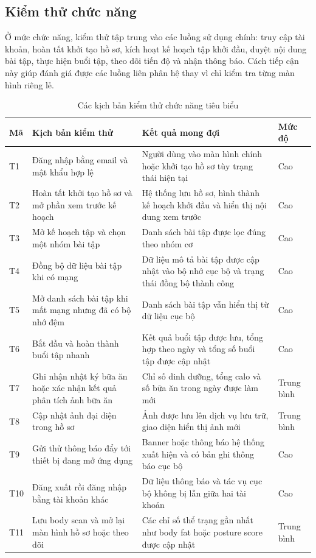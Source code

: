\subsection{Kiểm thử chức năng}

Ở mức chức năng, kiểm thử tập trung vào các luồng sử dụng chính: truy cập tài khoản, hoàn tất khởi tạo hồ sơ, kích hoạt kế hoạch tập khởi đầu, duyệt nội dung bài tập, thực hiện buổi tập, theo dõi tiến độ và nhận thông báo. Cách tiếp cận này giúp đánh giá được các luồng liên phân hệ thay vì chỉ kiểm tra từng màn hình riêng lẻ.

\begin{table}[H]
\centering
\small
\caption{Các kịch bản kiểm thử chức năng tiêu biểu}
\label{tab:functional-test-scenarios}
\begin{tabular}{|p{1.1cm}|p{3.9cm}|p{4.5cm}|p{2.5cm}|}
\hline
\textbf{Mã} & \textbf{Kịch bản kiểm thử} & \textbf{Kết quả mong đợi} & \textbf{Mức độ} \\ \hline
T1 & Đăng nhập bằng email và mật khẩu hợp lệ & Người dùng vào màn hình chính hoặc khởi tạo hồ sơ tùy trạng thái hiện tại & Cao \\ \hline
T2 & Hoàn tất khởi tạo hồ sơ và mở phần xem trước kế hoạch & Hệ thống lưu hồ sơ, hình thành kế hoạch khởi đầu và hiển thị nội dung xem trước & Cao \\ \hline
T3 & Mở kế hoạch tập và chọn một nhóm bài tập & Danh sách bài tập được lọc đúng theo nhóm cơ & Cao \\ \hline
T4 & Đồng bộ dữ liệu bài tập khi có mạng & Dữ liệu mô tả bài tập được cập nhật vào bộ nhớ cục bộ và trạng thái đồng bộ thành công & Cao \\ \hline
T5 & Mở danh sách bài tập khi mất mạng nhưng đã có bộ nhớ đệm & Danh sách bài tập vẫn hiển thị từ dữ liệu cục bộ & Cao \\ \hline
T6 & Bắt đầu và hoàn thành buổi tập nhanh & Kết quả buổi tập được lưu, tổng hợp theo ngày và tổng số buổi tập được cập nhật & Cao \\ \hline
T7 & Ghi nhận nhật ký bữa ăn hoặc xác nhận kết quả phân tích ảnh bữa ăn & Chỉ số dinh dưỡng, tổng calo và số bữa ăn trong ngày được làm mới & Trung bình \\ \hline
T8 & Cập nhật ảnh đại diện trong hồ sơ & Ảnh được lưu lên dịch vụ lưu trữ, giao diện hiển thị ảnh mới & Trung bình \\ \hline
T9 & Gửi thử thông báo đẩy tới thiết bị đang mở ứng dụng & Banner hoặc thông báo hệ thống xuất hiện và có bản ghi thông báo cục bộ & Cao \\ \hline
T10 & Đăng xuất rồi đăng nhập bằng tài khoản khác & Dữ liệu thông báo và tác vụ cục bộ không bị lẫn giữa hai tài khoản & Cao \\ \hline
T11 & Lưu body scan và mở lại màn hình hồ sơ hoặc theo dõi & Các chỉ số thể trạng gần nhất như body fat hoặc posture score được cập nhật & Trung bình \\ \hline
\end{tabular}
\normalsize
\end{table}


